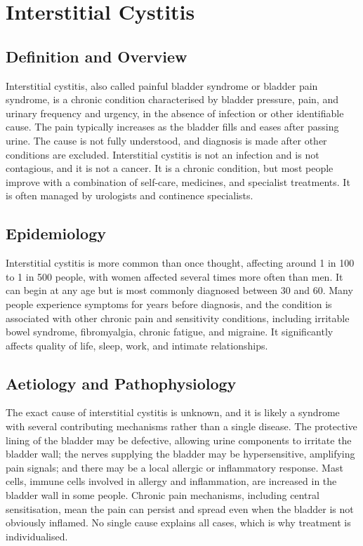 \chapter{Interstitial Cystitis}

\section*{Definition and Overview}
Interstitial cystitis, also called painful bladder syndrome or bladder pain syndrome, is a chronic condition characterised by bladder pressure, pain, and urinary frequency and urgency, in the absence of infection or other identifiable cause. The pain typically increases as the bladder fills and eases after passing urine. The cause is not fully understood, and diagnosis is made after other conditions are excluded. Interstitial cystitis is not an infection and is not contagious, and it is not a cancer. It is a chronic condition, but most people improve with a combination of self-care, medicines, and specialist treatments. It is often managed by urologists and continence specialists.

\section*{Epidemiology}
Interstitial cystitis is more common than once thought, affecting around 1 in 100 to 1 in 500 people, with women affected several times more often than men. It can begin at any age but is most commonly diagnosed between 30 and 60. Many people experience symptoms for years before diagnosis, and the condition is associated with other chronic pain and sensitivity conditions, including irritable bowel syndrome, fibromyalgia, chronic fatigue, and migraine. It significantly affects quality of life, sleep, work, and intimate relationships.

\section*{Aetiology and Pathophysiology}
The exact cause of interstitial cystitis is unknown, and it is likely a syndrome with several contributing mechanisms rather than a single disease. The protective lining of the bladder may be defective, allowing urine components to irritate the bladder wall; the nerves supplying the bladder may be hypersensitive, amplifying pain signals; and there may be a local allergic or inflammatory response. Mast cells, immune cells involved in allergy and inflammation, are increased in the bladder wall in some people. Chronic pain mechanisms, including central sensitisation, mean the pain can persist and spread even when the bladder is not obviously inflamed. No single cause explains all cases, which is why treatment is individualised.

